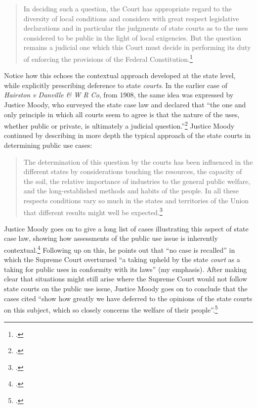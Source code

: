\begin{quote}
In deciding such a question, the Court has appropriate regard to the diversity of local conditions and considers with great respect legislative declarations and in particular the judgments of state courts as to the uses considered to be public in the light of local exigencies. But the question remains a judicial one which this Court must decide in performing its duty of enforcing the provisions of the Federal Constitution.\footcite[447]{vester30}
\end{quote}

Notice how this echoes the contextual approach developed at the state level, while explicitly prescribing deference to state {\it courts}. In the earlier case of {\it Hairston v Danville \& W R Co}, from 1908, the same idea was expressed by Justice Moody, who surveyed the state case law and declared that ``the one and only principle in which all courts seem to agree is that the nature of the uses, whether public or private, is ultimately a judicial question.''\footcite[606]{hairston08} Justice Moody continued by describing in more depth the typical approach of the state courts in determining public use cases:

\begin{quote}
The determination of this question by the courts has been influenced in the different states by considerations touching the resources, the capacity of the soil, the relative importance of industries to the general public welfare, and the long-established methods and habits of the people. In all these respects conditions vary so much in the states and territories of the Union that different results might well be expected.\footcite[606]{hairston08}
\end{quote}

Justice Moody goes on to give a long list of cases illustrating this aspect of state case law, showing how assessments of the public use issue is inherently contextual.\footcite[607]{hairston08} %
Following up on this, he points out that ``no case is recalled'' in which the Supreme Court overturned ``a taking upheld by the state {\it court} as a taking for public uses in conformity with its laws'' (my emphasis). After making clear that situations might still arise where the Supreme Court would not follow state courts on the public use issue, Justice Moody goes on to conclude that the cases cited ``show how greatly we have deferred to the opinions of the state courts on this subject, which so closely concerns the welfare of their people''.\footcite[606]{hairston08}

